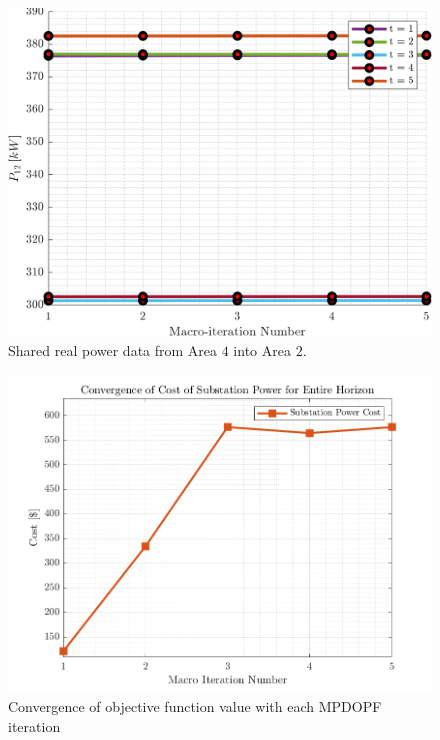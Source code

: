 \documentclass[../../outputs/main.tex]{subfiles}
\begin{document}
\begin{figure}[t]
    \centering
    \includegraphics[width=0.8\columnwidth]{../figures/T5-pv20-batt30-genCost/dopf/convergenceCurves/BoundaryRealPower_vs_t_vs_macroItr_T_5_Areas_2_4_genCost_pv_20_batt_30_crop.png}
    \caption{Shared real power data from Area $4$ into Area $2$.}
  \label{fig:convergenceCurves-5-20-30}
    \vspace{-4mm}
\end{figure}

\begin{figure}[t] %
    \centering
    \includegraphics[height=0.25\textheight]{../figures/T5-pv20-batt30-genCost/dopf/outputCurves/ObjectiveConvergenceCurves_Horizon_5.png}
    \caption{Convergence of objective function value with each MPDOPF iteration}
    \label{fig:outputConvergence-5-pv20-batt30-genCost}
    \vspace{-4mm}
\end{figure}
\end{document}
